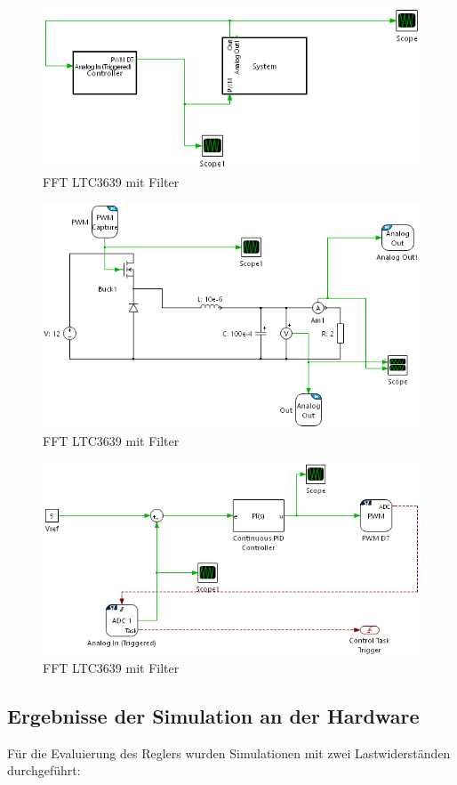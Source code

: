 \begin{figure}[H]
    \centering
    \includegraphics[width=0.6\linewidth]{Figure/Hard.png}
    \caption{FFT LTC3639 mit Filter}
    \label{fig:Hard}
\end{figure}

\begin{figure}[H]
    \centering
    \includegraphics[width=0.6\linewidth]{Figure/SystemHard.png}
    \caption{FFT LTC3639 mit Filter}
    \label{fig:SystemHard}
\end{figure}

\begin{figure}[H]
    \centering
    \includegraphics[width=0.6\linewidth]{Figure/ControllerHard.png}
    \caption{FFT LTC3639 mit Filter}
    \label{fig:ControllerHard}
\end{figure}





\subsection{Ergebnisse der Simulation an der Hardware}

Für die Evaluierung des Reglers wurden Simulationen mit zwei Lastwiderständen durchgeführt:


